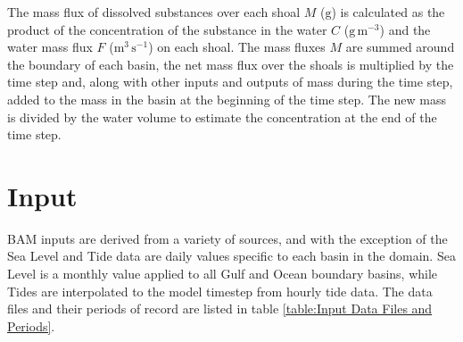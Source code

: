 The mass flux of dissolved substances over each shoal $M$ ($\mathrm{g}$) is calculated as the product of the concentration of the substance in the water $C$ ($\mathrm{g \, m^{-3}}$) and the water mass flux $F$ ($\mathrm{m^{3} \, s^{-1}}$) on each shoal.  The mass fluxes $M$ are summed around the boundary of each basin, the net mass flux over the shoals is multiplied by the time step and, along with other inputs and outputs of mass during the time step, added to the mass in the basin at the beginning of the time step. The new mass is divided by the water volume to estimate the concentration at the end of the time step. 


\clearpage 
\section{Input}
\label{sec:Input}
BAM inputs are derived from a variety of sources, and with the exception of the Sea Level and Tide data are daily values specific to each basin in the domain.  Sea Level is a monthly value applied to all Gulf and Ocean boundary basins, while Tides are interpolated to the model timestep from hourly tide data.  The data files and their periods of record are listed in table \ref{table:Input Data Files and Periods}. 


